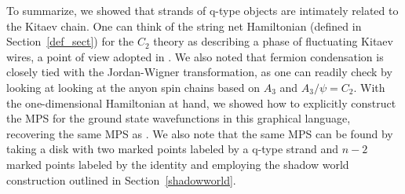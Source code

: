 To summarize, we showed that strands of q-type objects are intimately related to the Kitaev chain. 
One can think of the string net Hamiltonian (defined in Section~\ref{def_sect}) for the $C_2$ theory as describing a phase of fluctuating Kitaev wires, a point of view adopted in \cite{tarantino2016,ware2016,kapustin2017}.
We also noted that fermion condensation is closely tied with the Jordan-Wigner transformation, as one can readily check by looking at looking at the anyon spin chains based on $A_3$ and $A_3/\psi = C_2$.
With the one-dimensional Hamiltonian at hand, we showed how to explicitly construct the MPS for the ground state wavefunctions in this graphical language, recovering the same MPS as \cite{fidkowski2011,turzillo2016,bultinck2017b}.
We also note that the same MPS can be found by taking a disk with two marked points labeled by a q-type strand and $n-2$ marked points labeled by the identity 
and employing the shadow world construction outlined in Section~\ref{shadowworld}.


